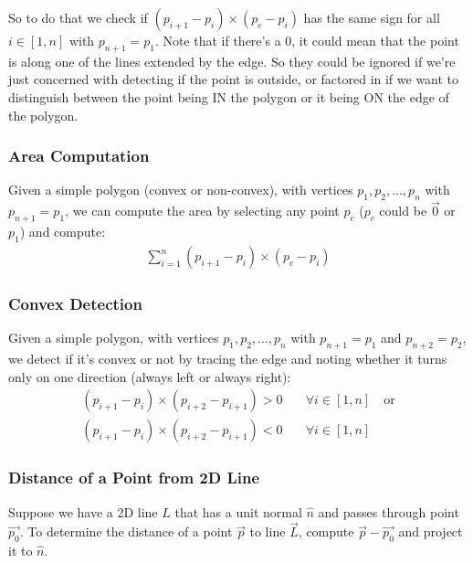 \documentclass[12pt]{report}
\begin{document}
So to do that we check if $(p_{i+1} - p_i) \times (p_c - p_i)$ has the same sign for all $i \in [1,n]$ with $p_{n + 1} = p_1$. Note that if there's a $0$, it could mean that the point is along one of the lines extended by the edge. So they could be ignored if we're just concerned with detecting if the point is outside, or factored in if we want to distinguish between the point being IN the polygon or it being ON the edge of the polygon.
		
\subsubsection{Area Computation}
Given a simple polygon (convex or non-convex), with vertices $p_1, p_2, \dots, p_n$ with $p_{n+1} = p_1$, we can compute the area by selecting any point $p_c$ ($p_c$ could be $\vec{0}$ or $p_1$) and compute:
\begin{align}
	\sum_{i = 1}^{n} (p_{i + 1} - p_i) \times (p_c - p_i) 
\end{align}
\subsubsection{Convex Detection}
Given a simple polygon, with vertices $p_1, p_2, \dots, p_n$ with $p_{n+1} = p_1$ and $p_{n+2} = p_2$, we detect if it's convex or not by tracing the edge and noting whether it turns only on one direction (always left or always right):
\begin{align*}
	(p_{i + 1} - p_i) \times (p_{i + 2} - p_{i + 1}) > 0 & \quad \forall i \in [1,n] \quad \text{or} \\
	(p_{i + 1} - p_i) \times (p_{i + 2} - p_{i + 1}) < 0 & \quad \forall i \in [1,n]                 
\end{align*}
\subsubsection{Distance of a Point from 2D Line}
Suppose we have a 2D line $L$ that has a unit normal $\hat{n}$ and passes through point $\vec{p_0}$. To determine the distance of a point $\vec{p}$ to line $\vec{L}$, compute $\vec{p} -\vec{p_0}$ and project it to $\hat{n}$.
\begin{center}
\end{center}
\end{document}
